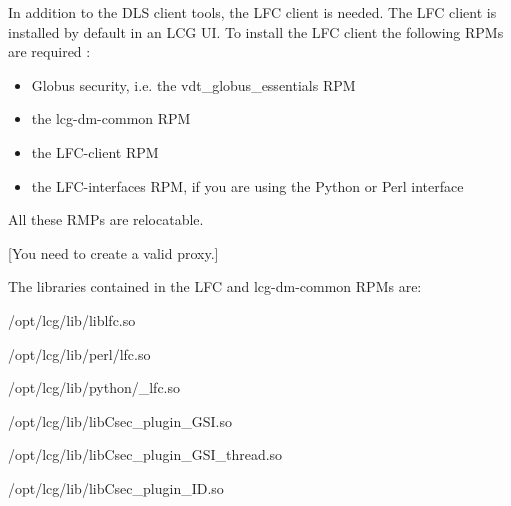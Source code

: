 \documentclass[pdftex]{cmspaper}
\begin{document}
In addition to the DLS client tools, the LFC client is needed.
The LFC client is installed by default in an LCG UI. 
To install the LFC client the following RPMs are required :
\begin{itemize}
\item Globus security, i.e. the vdt\_globus\_essentials RPM
\item the lcg-dm-common RPM
\item the LFC-client RPM
\item the LFC-interfaces RPM, if you are using the Python or Perl interface
\end{itemize}
All these RMPs are relocatable.

[You need to create a valid proxy.]                 

                                                 
The libraries contained in the LFC and lcg-dm-common RPMs are:
                                                                                                        
/opt/lcg/lib/liblfc.so

/opt/lcg/lib/perl/lfc.so

/opt/lcg/lib/python/\_lfc.so

/opt/lcg/lib/libCsec\_plugin\_GSI.so

/opt/lcg/lib/libCsec\_plugin\_GSI\_thread.so

/opt/lcg/lib/libCsec\_plugin\_ID.so
\end{document}
